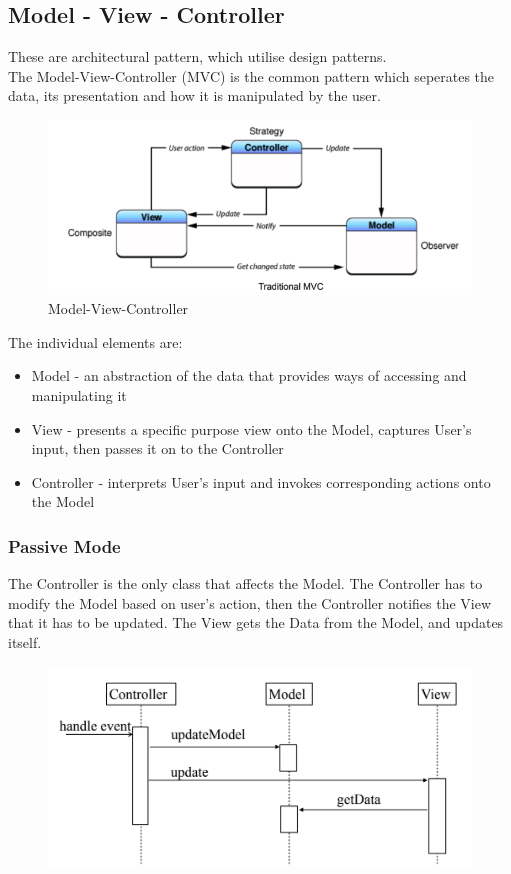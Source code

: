 \documentclass{article}
\begin{document}
\subsection{Model - View - Controller}
These are architectural pattern, which utilise design patterns. \\ The Model-View-Controller (MVC) is the common pattern which seperates the data, its presentation and how it is manipulated by the user.
\begin{figure}[H]
    \centering
    \includegraphics[width=0.6\linewidth]{Pictures/Screenshot 2023-02-05 at 12.52.08.png}
    \caption{Model-View-Controller}
\end{figure}
The individual elements are:
\begin{itemize}
    \item Model - an abstraction of the data that provides ways of accessing and manipulating it
    \item View - presents a specific purpose view onto the Model, captures User's input, then passes it on to the Controller
    \item Controller - interprets User's input and invokes corresponding actions onto the Model
\end{itemize}
\subsubsection*{Passive Mode}
The Controller is the only class that affects the Model. The Controller has to modify the Model based on user's action, then the Controller notifies the View that it has to be updated. The View gets the Data from the Model, and updates itself.
\begin{figure}[H]
    \centering
    \includegraphics[width=0.6\linewidth]{Pictures/Screenshot 2023-02-05 at 12.55.35.png}
\end{figure}
\end{document}
